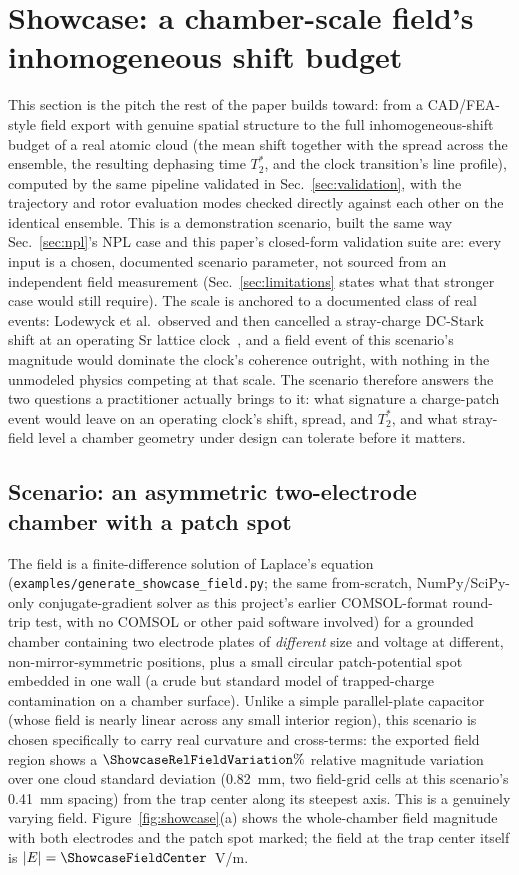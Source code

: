 \documentclass[aps,pra,superscriptaddress,groupedaddress,nofootinbib]{revtex4-2}
\begin{document}
\FloatBarrier
\section{Showcase: a chamber-scale field's inhomogeneous shift budget}
\label{sec:showcase}

This section is the pitch the rest of the paper builds toward: from a
CAD/FEA-style field export with genuine spatial structure to the full
inhomogeneous-shift budget of a real atomic cloud (the mean shift
together with the spread across the ensemble, the resulting dephasing
time $T_2^*$, and the clock transition's line profile), computed by the same
pipeline validated in Sec.~\ref{sec:validation}, with the trajectory and
rotor evaluation modes checked directly against each other on the
identical ensemble. This is a demonstration scenario, built the same way
Sec.~\ref{sec:npl}'s NPL case and this paper's closed-form validation
suite are: every input is a chosen, documented scenario parameter, not
sourced from an independent field measurement (Sec.~\ref{sec:limitations}
states what that stronger case would still require). The scale is
anchored to a documented class of real events: Lodewyck et al.\
observed and then cancelled a stray-charge DC-Stark shift at an
operating Sr lattice clock~\cite{Lodewyck2012}, and a field event of
this scenario's magnitude would dominate the clock's coherence
outright, with nothing in the unmodeled physics competing at that
scale. The scenario therefore answers the two questions a practitioner
actually brings to it: what signature a charge-patch event would leave
on an operating clock's shift, spread, and $T_2^*$, and what
stray-field level a chamber geometry under design can tolerate before
it matters.

\subsection{Scenario: an asymmetric two-electrode chamber with a patch spot}

The field is a finite-difference solution of Laplace's equation
(\texttt{examples/generate\_showcase\_field.py}; the same from-scratch,
NumPy/SciPy-only conjugate-gradient solver as this project's earlier
COMSOL-format round-trip test, with no COMSOL or other paid software
involved) for a grounded chamber containing two electrode plates of
\emph{different} size and voltage at different, non-mirror-symmetric
positions, plus a small circular patch-potential spot embedded in one
wall (a crude but standard model of trapped-charge contamination on a
chamber surface). Unlike a simple parallel-plate capacitor (whose field is
nearly linear across any small interior region), this scenario is chosen
specifically to carry real curvature and cross-terms: the exported field
region shows a $\ShowcaseRelFieldVariation\%$ relative magnitude
variation over one cloud standard deviation (0.82~mm, two field-grid
cells at this scenario's 0.41~mm spacing) from the trap center along its
steepest axis. This is a genuinely varying field. Figure~\ref{fig:showcase}(a)
shows the whole-chamber field magnitude with both electrodes and the
patch spot marked; the field at the trap center itself is
$|E|=\ShowcaseFieldCenter$~V/m.
\end{document}
